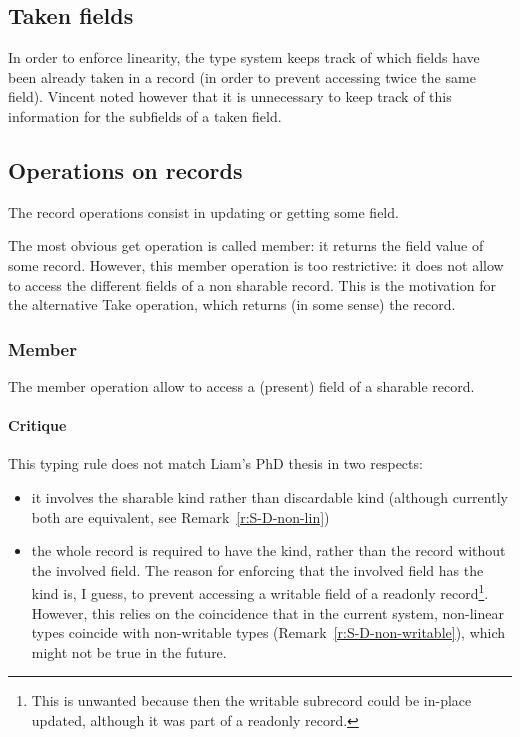 \documentclass{article}
\begin{document}
\subsection{Taken fields}
In order to enforce linearity, the type system keeps track of which fields
have been already taken in a record (in order to prevent accessing twice the
same field). Vincent noted however that it is unnecessary to keep track of this
information for the subfields of a taken field.


\subsection{Operations on records}
The record operations consist in updating or getting some field.

The most obvious get operation is called member: it returns the field value
of some record. However, this member operation is too restrictive: 
it does not allow to access the different fields of a non sharable record.
This is the motivation for the alternative Take operation,
which returns (in some sense) the record.
\subsubsection{Member}
The member operation allow to
access a (present) field
of a
sharable record.

\paragraph{Critique} This typing rule does not match Liam's PhD thesis in two
respects:
\begin{itemize}
\item it involves the sharable kind rather than discardable kind (although currently
  both are equivalent, see Remark~\ref{r:S-D-non-lin})
  \item the whole record is required to have the kind, rather than the record
    without the involved field.
    The reason for enforcing that the involved field has the kind
    is, I guess, to prevent accessing a writable field of a readonly
    record\footnote{This is unwanted because then the writable subrecord could
      be in-place updated, although it was part of a readonly record.}. However, this
    relies on the coincidence that in the current system, non-linear types
    coincide with non-writable types (Remark~\ref{r:S-D-non-writable}), which
    might not be true in the future.
\end{itemize}
\end{document}

